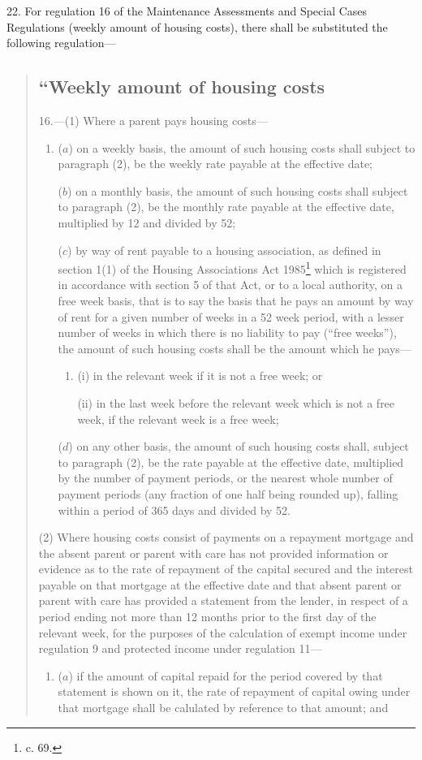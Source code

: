 \documentclass[12pt,a4paper]{article}
\begin{document}
22.  For regulation 16 of the Maintenance Assessments and Special Cases Regulations (weekly amount of housing costs), there shall be substituted the following regulation—
\begin{quotation}
\subsection*{“Weekly amount of housing costs}

16.—(1) Where a parent pays housing costs—
\begin{enumerate}\item[]
($a$) on a weekly basis, the amount of such housing costs shall subject to paragraph (2), be the weekly rate payable at the effective date;

($b$) on a monthly basis, the amount of such housing costs shall subject to paragraph (2), be the monthly rate payable at the effective date, multiplied by 12 and divided by 52;

($c$) by way of rent payable to a housing association, as defined in section 1(1) of the Housing Associations Act 1985\footnote{ c. 69.} which is registered in accordance with section 5 of that Act, or to a local authority, on a free week basis, that is to say the basis that he pays an amount by way of rent for a given number of weeks in a 52 week period, with a lesser number of weeks in which there is no liability to pay (“free weeks”), the amount of such housing costs shall be the amount which he pays—
\begin{enumerate}\item[]
(i) in the relevant week if it is not a free week; or

(ii) in the last week before the relevant week which is not a free week, if the relevant week is a free week;
\end{enumerate}

($d$) on any other basis, the amount of such housing costs shall, subject to paragraph (2), be the rate payable at the effective date, multiplied by the number of payment periods, or the nearest whole number of payment periods (any fraction of one half being rounded up), falling within a period of 365 days and divided by 52.
\end{enumerate}

(2) Where housing costs consist of payments on a repayment mortgage and the absent parent or parent with care has not provided information or evidence as to the rate of repayment of the capital secured and the interest payable on that mortgage at the effective date and that absent parent or parent with care has provided a statement from the lender, in respect of a period ending not more than 12 months prior to the first day of the relevant week, for the purposes of the calculation of exempt income under regulation 9 and protected income under regulation 11—
\begin{enumerate}\item[]
($a$) if the amount of capital repaid for the period covered by that statement is shown on it, the rate of repayment of capital owing under that mortgage shall be calulated by reference to that amount; and


\end{enumerate}
\end{quotation}
\end{document}
